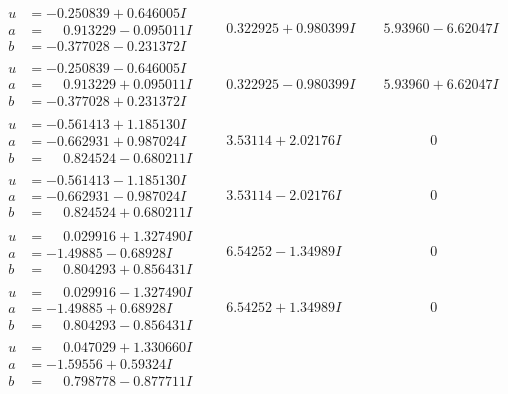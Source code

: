 \documentclass[1p]{elsarticle_modified}
\theoremstyle{definition}
\begin{document}
$$\begin{array}{c|c|c}
\begin{aligned}
u &= -0.250839 + 0.646005 I \\
a &= \phantom{-}0.913229 - 0.095011 I \\
b &= -0.377028 - 0.231372 I\end{aligned}
 & \phantom{-}0.322925 + 0.980399 I & \phantom{-}5.93960 - 6.62047 I \\ \hline\begin{aligned}
u &= -0.250839 - 0.646005 I \\
a &= \phantom{-}0.913229 + 0.095011 I \\
b &= -0.377028 + 0.231372 I\end{aligned}
 & \phantom{-}0.322925 - 0.980399 I & \phantom{-}5.93960 + 6.62047 I \\ \hline\begin{aligned}
u &= -0.561413 + 1.185130 I \\
a &= -0.662931 + 0.987024 I \\
b &= \phantom{-}0.824524 - 0.680211 I\end{aligned}
 & \phantom{-}3.53114 + 2.02176 I & \phantom{-0.000000 } 0 \\ \hline\begin{aligned}
u &= -0.561413 - 1.185130 I \\
a &= -0.662931 - 0.987024 I \\
b &= \phantom{-}0.824524 + 0.680211 I\end{aligned}
 & \phantom{-}3.53114 - 2.02176 I & \phantom{-0.000000 } 0 \\ \hline\begin{aligned}
u &= \phantom{-}0.029916 + 1.327490 I \\
a &= -1.49885 - 0.68928 I \\
b &= \phantom{-}0.804293 + 0.856431 I\end{aligned}
 & \phantom{-}6.54252 - 1.34989 I & \phantom{-0.000000 } 0 \\ \hline\begin{aligned}
u &= \phantom{-}0.029916 - 1.327490 I \\
a &= -1.49885 + 0.68928 I \\
b &= \phantom{-}0.804293 - 0.856431 I\end{aligned}
 & \phantom{-}6.54252 + 1.34989 I & \phantom{-0.000000 } 0 \\ \hline\begin{aligned}
u &= \phantom{-}0.047029 + 1.330660 I \\
a &= -1.59556 + 0.59324 I \\
b &= \phantom{-}0.798778 - 0.877711 I\end{aligned}

\end{array}$$
\end{document}
